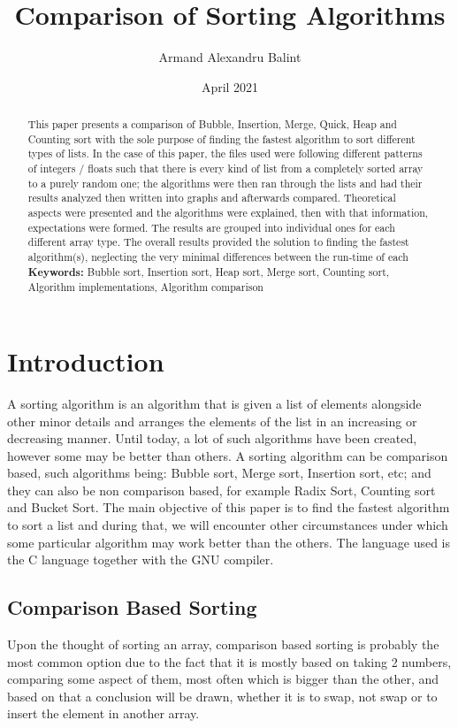 \documentclass{article}
\title{Comparison of Sorting Algorithms}
\author{Armand Alexandru Balint\\}
\date{April 2021}
\begin{document}
\maketitle
\begin{abstract}
This paper presents a comparison of Bubble, Insertion, Merge, Quick, Heap and Counting sort with the sole purpose of finding the fastest algorithm to sort different types of lists. In the case of this paper, the files used were following different patterns of integers / floats such that there is every kind of list from a completely sorted array to a purely random one; the algorithms were then ran through the lists and had their results analyzed then written into graphs and afterwards compared. Theoretical aspects were presented and the algorithms were explained, then with that information, expectations were formed. The results are grouped into individual ones for each different array type. The overall results provided the solution to finding the fastest algorithm(s), neglecting the very minimal differences between the run-time of each \newline \newline \textbf{Keywords:} \footnotesize Bubble sort, Insertion sort, Heap sort, Merge sort, Counting sort, Algorithm implementations, Algorithm comparison


\end{abstract}
\normalsize
\clearpage
\tableofcontents
\clearpage

\section{Introduction}
A sorting algorithm is an algorithm that is given a list of elements alongside other minor details and arranges the elements of the list in an increasing or decreasing manner. Until today, a lot of such algorithms have been created, however some may be better than others. A sorting algorithm can be comparison based, such algorithms being: Bubble sort, Merge sort, Insertion sort, etc; and they can also be non comparison based, for example Radix Sort, Counting sort and Bucket Sort. The main objective of this paper is to find the fastest algorithm to sort a list and during that, we will encounter other circumstances under which some particular algorithm may work better than the others. The language used is the C language together with the GNU compiler.

\subsection{Comparison Based Sorting}
Upon the thought of sorting an array, comparison based sorting is probably the most common option due to the fact that it is mostly based on taking 2 numbers, comparing some aspect of them, most often which is bigger than the other, and based on that a conclusion will be drawn, whether it is to swap, not swap or to insert the element in another array.
\end{document}
